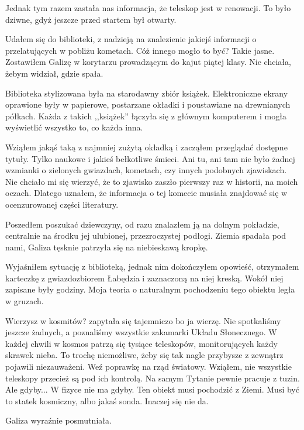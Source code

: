 Jednak tym razem zastała nas informacja, że teleskop jest w renowacji.
To było dziwne, gdyż jeszcze przed startem był otwarty.

Udałem się do biblioteki, z nadzieją na znalezienie jakiejś informacji o przelatujących w pobliżu kometach.
Cóż innego mogło to być? Takie jasne.
Zostawiłem Galizę w korytarzu prowadzącym do kajut piątej klasy.
Nie chciała, żebym widział, gdzie spała.

Biblioteka stylizowana była na starodawny zbiór książek.
Elektroniczne ekrany oprawione były w papierowe, postarzane okładki i poustawiane na drewnianych półkach.
Każda z takich ,,książek'' łączyła się z głównym komputerem i mogła wyświetlić wszystko to, co każda inna.

Wziąłem jakąś taką z najmniej zużytą okładką i zacząłem przeglądać dostępne tytuły.
Tylko naukowe i jakieś bełkotliwe śmieci.
Ani tu, ani tam nie było żadnej wzmianki o zielonych gwiazdach, kometach, czy innych podobnych zjawiskach.
Nie chciało mi się wierzyć, że to zjawisko zaszło pierwszy raz w historii, na moich oczach.
Dlatego uznałem, że informacja o tej komecie musiała znajdować się w ocenzurowanej części literatury.

Poszedłem poszukać dziewczyny, od razu znalazłem ją na dolnym pokładzie, centralnie na środku jej ulubionej, przezroczystej podłogi.
Ziemia spadała pod nami, Galiza tęsknie patrzyła się na niebieskawą kropkę.

Wyjaśniłem sytuację z biblioteką, jednak nim dokończyłem opowieść, otrzymałem karteczkę z gwiazdozbiorem Łabędzia i zaznaczoną na niej kreską.
Wokół niej zapisane były godziny.
Moja teoria o naturalnym pochodzeniu tego obiektu legła w gruzach.

\begin{dialogue}
	\ds{} Wierzysz w kosmitów? \dm{} zapytała się tajemniczo \dm{} bo ja wierzę.
	\ds{} Nie spotkaliśmy jeszcze żadnych, a poznaliśmy wszystkie zakamarki Układu Słonecznego. W każdej chwili w kosmos patrzą się tysiące teleskopów, monitorujących każdy skrawek nieba. To trochę niemożliwe, żeby się tak nagle przybysze z zewnątrz pojawili niezauważeni.
	\ds{} Weź poprawkę na rząd światowy.
	\ds{} Wziąłem, nie wszystkie teleskopy przecież są pod ich kontrolą. Na samym Tytanie pewnie pracuje z tuzin.
	\ds{} Ale gdyby...
	\ds{} W fizyce nie ma gdyby. Ten obiekt musi pochodzić z Ziemi. Musi być to statek kosmiczny, albo jakaś sonda. Inaczej się nie da.
\end{dialogue}

Galiza wyraźnie posmutniała.

